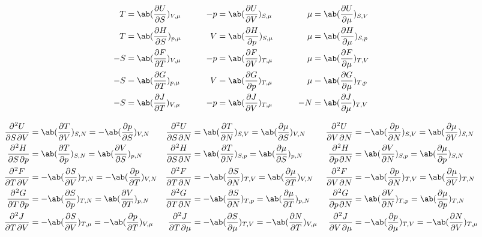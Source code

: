 \documentclass[a4paper,11pt]{jlreq}
\begin{document}
\begin{theorem}
  \begin{alignat}{5}
    T  & = \ab(\diffp{U}{S})_{V,\mu} & \qquad -p & = \ab(\diffp{U}{V})_{S,\mu} & \qquad \mu & = \ab(\diffp{U}{\mu})_{S,V} \\
    T  & = \ab(\diffp{H}{S})_{p,\mu} & \qquad V  & = \ab(\diffp{H}{p})_{S,\mu} & \qquad \mu & = \ab(\diffp{H}{\mu})_{S,p} \\
    -S & = \ab(\diffp{F}{T})_{V,\mu} & \qquad -p & = \ab(\diffp{F}{V})_{T,\mu} & \qquad \mu & = \ab(\diffp{F}{\mu})_{T,V} \\
    -S & = \ab(\diffp{G}{T})_{p,\mu} & \qquad V  & = \ab(\diffp{G}{p})_{T,\mu} & \qquad \mu & = \ab(\diffp{G}{\mu})_{T,p} \\
    -S & = \ab(\diffp{J}{T})_{V,\mu} & \qquad -p & = \ab(\diffp{J}{V})_{T,\mu} & \qquad -N  & = \ab(\diffp{J}{\mu})_{T,V}
  \end{alignat}
\end{theorem}

\begin{proposition}
  \begin{align*}
    \diffp{U}{S,V} & = \ab(\diffp{T}{V})_{S,N} = -\ab(\diffp{p}{S})_{V,N}      & \diffp{U}{S,N}   & = \ab(\diffp{T}{N})_{S,V} = \ab(\diffp{\mu}{S})_{V,N}     & \diffp{U}{V,N}   & = -\ab(\diffp{p}{N})_{S,V} = \ab(\diffp{\mu}{V})_{S,N}    \\
    \diffp{H}{S,p} & = \ab(\diffp{T}{p})_{S,N} = \ab(\diffp{V}{S})_{p,N}       & \diffp{H}{S,N}   & = \ab(\diffp{T}{N})_{S,p} = \ab(\diffp{\mu}{S})_{p,N}     & \diffp{H}{p,N}   & = \ab(\diffp{V}{N})_{S,p} = \ab(\diffp{\mu}{p})_{S,N}     \\
    \diffp{F}{T,V} & = -\ab(\diffp{S}{V})_{T,N} = -\ab(\diffp{p}{T})_{V,N}     & \diffp{F}{T,N}   & = -\ab(\diffp{S}{N})_{T,V} = \ab(\diffp{\mu}{T})_{V,N}    & \diffp{F}{V,N}   & = -\ab(\diffp{p}{N})_{T,V} = \ab(\diffp{\mu}{V})_{T,N}    \\
    \diffp{G}{T,p} & = -\ab(\diffp{S}{p})_{T,N} = \ab(\diffp{V}{T})_{p,N}      & \diffp{G}{T,N}   & = -\ab(\diffp{S}{N})_{T,p} = \ab(\diffp{\mu}{T})_{p,N}    & \diffp{G}{p,N}   & = \ab(\diffp{V}{N})_{T,p} = \ab(\diffp{\mu}{p})_{T,N}     \\
    \diffp{J}{T,V} & = -\ab(\diffp{S}{V})_{T,\mu} = -\ab(\diffp{p}{T})_{V,\mu} & \diffp{J}{T,\mu} & = -\ab(\diffp{S}{\mu})_{T,V} = -\ab(\diffp{N}{T})_{V,\mu} & \diffp{J}{V,\mu} & = -\ab(\diffp{p}{\mu})_{T,V} = -\ab(\diffp{N}{V})_{T,\mu}
  \end{align*}
\end{proposition}
\end{document}
